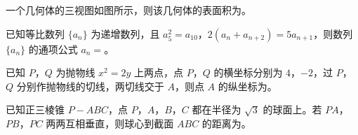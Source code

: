 \Needspace{0.4\textheight}
\begin{question}
一个几何体的三视图如图所示，则该几何体的表面积为\gkblank{}。
\nopagebreak[4]
\begin{center}\end{center}
\nopagebreak[4]
\end{question}
\begin{question}
已知等比数列 $\{a_n\}$ 为递增数列，且 $a_5^2=a_{10}$，$2(a_n+a_{n+2})=5a_{n+1}$，则数列 $\{a_n\}$ 的通项公式 $a_n=$\gkblank{}。

\end{question}
\begin{question}
已知 $P$，$Q$ 为抛物线 $x^2=2y$ 上两点，点 $P$，$Q$ 的横坐标分别为 $4$，$-2$，过 $P$，$Q$ 分别作抛物线的切线，两切线交于 $A$，则点 $A$ 的纵坐标为\gkblank{}。

\end{question}
\begin{question}
已知正三棱锥 $P-ABC$，点 $P$，$A$，$B$，$C$ 都在半径为 $\sqrt3$ 的球面上。若 $PA$，$PB$，$PC$ 两两互相垂直，则球心到截面 $ABC$ 的距离为\gkblank{}。

\end{question}

